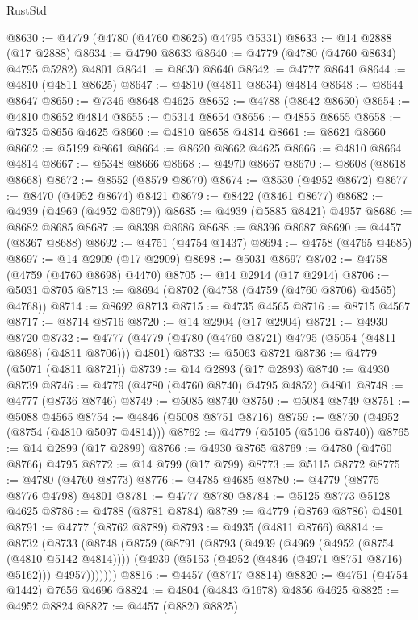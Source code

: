 \begin{lexlean}{RustStd}
\begin{coremodule}
@8630 := @4779 (@4780 (@4760 @8625) @4795 @5331)
@8633 := @14 @2888 (@17 @2888)
@8634 := @4790 @8633
@8640 := @4779 (@4780 (@4760 @8634) @4795 @5282) @4801
@8641 := @8630 @8640
@8642 := @4777 @8641
@8644 := @4810 (@4811 @8625)
@8647 := @4810 (@4811 @8634) @4814
@8648 := @8644 @8647
@8650 := @7346 @8648 @4625
@8652 := @4788 (@8642 @8650)
@8654 := @4810 @8652 @4814
@8655 := @5314 @8654
@8656 := @4855 @8655
@8658 := @7325 @8656 @4625
@8660 := @4810 @8658 @4814
@8661 := @8621 @8660
@8662 := @5199 @8661
@8664 := @8620 @8662 @4625
@8666 := @4810 @8664 @4814
@8667 := @5348 @8666
@8668 := @4970 @8667
@8670 := @8608 (@8618 @8668)
@8672 := @8552 (@8579 @8670)
@8674 := @8530 (@4952 @8672)
@8677 := @8470 (@4952 @8674) @8421
@8679 := @8422 (@8461 @8677)
@8682 := @4939 (@4969 (@4952 @8679))
@8685 := @4939 (@5885 @8421) @4957
@8686 := @8682 @8685
@8687 := @8398 @8686
@8688 := @8396 @8687
@8690 := @4457 (@8367 @8688)
@8692 := @4751 (@4754 @1437)
@8694 := @4758 (@4765 @4685)
@8697 := @14 @2909 (@17 @2909)
@8698 := @5031 @8697
@8702 := @4758 (@4759 (@4760 @8698) @4470)
@8705 := @14 @2914 (@17 @2914)
@8706 := @5031 @8705
@8713 := @8694 (@8702 (@4758 (@4759 (@4760 @8706) @4565) @4768))
@8714 := @8692 @8713
@8715 := @4735 @4565
@8716 := @8715 @4567
@8717 := @8714 @8716
@8720 := @14 @2904 (@17 @2904)
@8721 := @4930 @8720
@8732 := @4777 (@4779 (@4780 (@4760 @8721) @4795 (@5054 (@4811 @8698) (@4811 @8706))) @4801)
@8733 := @5063 @8721
@8736 := @4779 (@5071 (@4811 @8721))
@8739 := @14 @2893 (@17 @2893)
@8740 := @4930 @8739
@8746 := @4779 (@4780 (@4760 @8740) @4795 @4852) @4801
@8748 := @4777 (@8736 @8746)
@8749 := @5085 @8740
@8750 := @5084 @8749
@8751 := @5088 @4565
@8754 := @4846 (@5008 @8751 @8716)
@8759 := @8750 (@4952 (@8754 (@4810 @5097 @4814)))
@8762 := @4779 (@5105 (@5106 @8740))
@8765 := @14 @2899 (@17 @2899)
@8766 := @4930 @8765
@8769 := @4780 (@4760 @8766) @4795
@8772 := @14 @799 (@17 @799)
@8773 := @5115 @8772
@8775 := @4780 (@4760 @8773)
@8776 := @4785 @4685
@8780 := @4779 (@8775 @8776 @4798) @4801
@8781 := @4777 @8780
@8784 := @5125 @8773 @5128 @4625
@8786 := @4788 (@8781 @8784)
@8789 := @4779 (@8769 @8786) @4801
@8791 := @4777 (@8762 @8789)
@8793 := @4935 (@4811 @8766)
@8814 := @8732
    (@8733
      (@8748
        (@8759
          (@8791
            (@8793
              (@4939
                (@4969 (@4952 (@8754 (@4810 @5142 @4814))))
                (@4939 (@5153 (@4952 (@4846 (@4971 @8751 @8716) @5162))) @4957)))))))
@8816 := @4457 (@8717 @8814)
@8820 := @4751 (@4754 @1442) @7656 @4696
@8824 := @4804 (@4843 @1678) @4856 @4625
@8825 := @4952 @8824
@8827 := @4457 (@8820 @8825)

\end{coremodule}
\end{lexlean}
